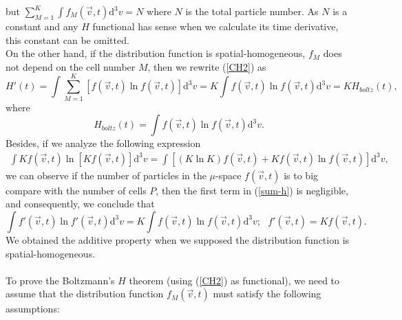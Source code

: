 \documentclass{article}
\begin{document}
  but $\sum_{M=1}^{K} \int f_M(\vec{v},t)\mathrm{d}^3v =N$ where $N$ is the total particle number. As $N$ is a constant and any $H$ functional has sense when we calculate its time derivative, this constant can be omitted. \\
  On the other hand, if the distribution function is spatial-homogeneous, $f_M$ does not depend on the cell number $M$, then we rewrite (\ref{CH2}) as
  \begin{equation}
      H'(t)=\int \sum_{M=1}^{K} [f(\vec{v},t)\ln f(\vec{v},t)] \mathrm{d}^{3}v = K\int  f(\vec{v},t) \ln f(\vec{v},t) \mathrm{d}^{3}v= K H_{boltz}(t), 
  \end{equation}
  where
  \begin{equation}
      H_{boltz}(t)=\int  f(\vec{v},t) \ln f(\vec{v},t) \mathrm{d}^{3}v.
  \end{equation}
  Besides, if we analyze the following expression
  \begin{eqnarray}
      \int Kf(\vec{v},t) \ln [Kf(\vec{v},t)] \mathrm{d}^{3}v = \int [(K\ln K)f(\vec{v},t) + Kf(\vec{v},t) \ln f(\vec{v},t)]\mathrm{d}^{3}v, \label{sum-h}
  \end{eqnarray}
  we can observe if the number of particles in the $\mu$-space $f(\vec{v},t)$ is to big compare with the number of cells $P$, then the first term in (\ref{sum-h}) is negligible, and consequently, we conclude that
  \begin{equation}
      \int f'(\vec{v},t) \ln f'(\vec{v},t) \mathrm{d}^{3}v = K\int f(\vec{v},t) \ln f(\vec{v},t) \mathrm{d}^{3}v; \ \ \ f'(\vec{v},t)= Kf(\vec{v},t). \label{aditive-property} 
  \end{equation}
  We obtained the additive property when we supposed the distribution function is spatial-homogeneous.\\
  \\
To prove the Boltzmann's $H$ theorem (using (\ref{CH2}) as functional), we need to assume that the distribution function $f_M(\vec{v},t)$ must satisfy the following assumptions:
\end{document}
